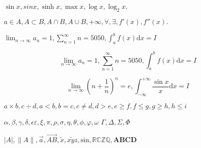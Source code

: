 \documentclass{article}
\begin{document}
    $\sin x, sin x, \sinh x, \max x, \log x, \log_2 x.$
    
    $a \in A, A \subset B, A \cap B, A \cup B, +\infty, \forall, \exists, f'(x),f''(x).$
    
    $\lim_{n \to\infty} a_n = 1, \sum_{n=1}^{\infty} n = 5050, \int_{a}^{b}f(x) \mathrm{d} x = I$
    
    $$\lim_{n \to\infty} a_n = 1, \sum_{n=1}^{\infty} n = 5050, \int_{a}^{b}f(x) \mathrm{d} x = I$$
    
    $$\lim_{n \to \infty} (n + \frac{1}{n})^n = e, \int_{-\infty}^{+\infty} \frac{\sin x}{x} \mathrm{d} x = I$$
    
    $a \times b, c \div d, a < b, b = c, c \neq d, d > e, e \geq f, f \leq g, g \geqslant h, h \leqslant i$ 
    
    $ \alpha,\beta,\gamma,\delta, \epsilon \varepsilon, \xi, \pi,\rho, \sigma, \eta, \theta, \phi, \varphi, \omega$
    $\Gamma, \Delta, \Sigma, \Phi$
    
    $|A|, \|A\|, \vec{a}, \overrightarrow{AB}, \tilde{x}, \widetilde{xyz}, \mathrm{sin}, \mathbb{RCZQ}, \mathbf{ABCD}$
\end{document}
